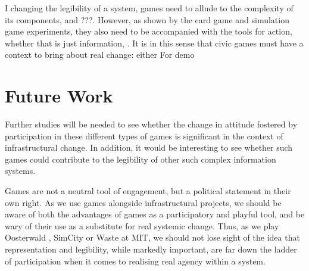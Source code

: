 \documentclass[nofonts,nols,justified,nobib]{tufte-book}
\begin{document}
I changing the legibility of a system, games need to allude to the complexity of its components, and ???. However, as shown by the card game and simulation game experiments, they also need to be accompanied with the tools for action, whether that is just information, . It is in this sense that civic games must have a context to bring about real change: either 
For demo

\section*{Future Work}
Further studies will be needed to see whether the change in attitude fostered by participation in these different types of games is significant in the context of infrastructural change. In addition, it would be interesting to see whether such games could contribute to the legibility of other such complex information systems.

Games are not a neutral tool of engagement, but a political statement in their own right. As we use games alongside infrastructural projects, we should be aware of both the advantages of games as a participatory and playful tool, and be wary of their use as a substitute for real systemic change. Thus, as we play Oosterwald \cite{play_the_city_play_2013}, SimCity or Waste at MIT, we should not lose sight of the idea that representation and legibility, while markedly important, are far down the ladder of participation when it comes to realising real agency within a system.

 
\end{document}
